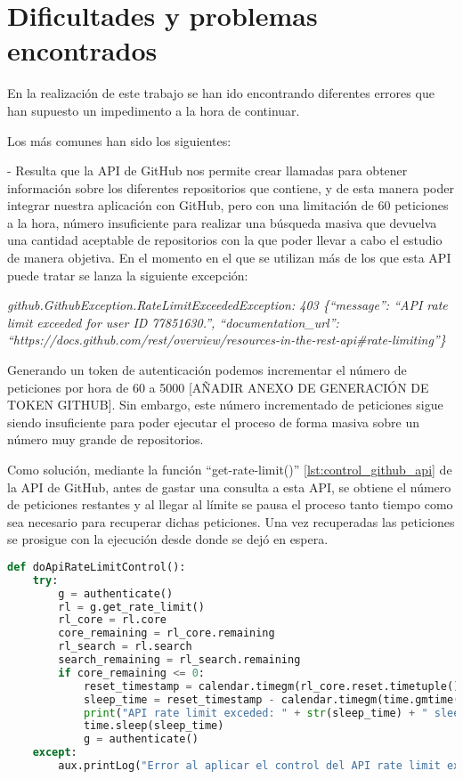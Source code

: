 \section{Dificultades y problemas encontrados}
En la realización de este trabajo se han ido encontrando diferentes errores que han supuesto un impedimento a la hora de continuar. 

Los más comunes han sido los siguientes:

- Resulta que la API de GitHub nos permite crear llamadas para obtener información sobre los diferentes repositorios que contiene, y de esta manera poder integrar nuestra aplicación con GitHub, pero con una limitación de 60 peticiones a la hora, número insuficiente para realizar una búsqueda masiva que devuelva una cantidad aceptable de repositorios con la que poder llevar a cabo el estudio de manera objetiva. En el momento en el que se utilizan más de los que esta API puede tratar se lanza la siguiente excepción: 

\textit{github.GithubException.RateLimitExceededException: 403 \{``message'': ``API rate limit exceeded for user ID 77851630.'', ``documentation\_url'': ``https://docs.github.com/rest/overview/resources-in-the-rest-api\#rate-limiting''\}}

Generando un token de autenticación podemos incrementar el número de peticiones por hora de 60 a 5000 [AÑADIR ANEXO DE GENERACIÓN DE TOKEN GITHUB]. Sin embargo, este número incrementado de peticiones sigue siendo insuficiente para poder ejecutar el proceso de forma masiva sobre un número muy grande de repositorios.

Como solución, mediante la función ``get-rate-limit()'' \ref{lst:control_github_api} de la API de GitHub, antes de gastar una consulta a esta API, se obtiene el número de peticiones restantes y al llegar al límite se pausa el proceso tanto tiempo como sea necesario para recuperar dichas peticiones. Una vez recuperadas las peticiones se prosigue con la ejecución desde donde se dejó en espera.

\begin{lstlisting}[language=Python, caption=Control del nº de peticiones a la API GitHub, label={lst:control_github_api}]
def doApiRateLimitControl():
    try:
        g = authenticate()
        rl = g.get_rate_limit()
        rl_core = rl.core
        core_remaining = rl_core.remaining
        rl_search = rl.search
        search_remaining = rl_search.remaining
        if core_remaining <= 0:
            reset_timestamp = calendar.timegm(rl_core.reset.timetuple())
            sleep_time = reset_timestamp - calendar.timegm(time.gmtime()) + 5
            print("API rate limit exceded: " + str(sleep_time) + " sleep_time. Waiting...")
            time.sleep(sleep_time)
            g = authenticate()
    except:
        aux.printLog("Error al aplicar el control del API rate limit exceded...", logging.ERROR)
\end{lstlisting}

